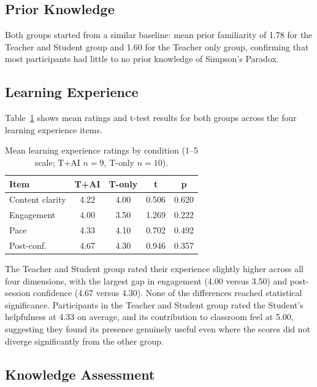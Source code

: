 \subsection{Prior Knowledge}

Both groups started from a similar baseline: mean prior familiarity of 1.78 for the Teacher and Student group and 1.60 for the Teacher only group, confirming that most participants had little to no prior knowledge of Simpson's Paradox.

\subsection{Learning Experience}

Table~\ref{tab:experience} shows mean ratings and t-test results for both groups across the four learning experience items.

\begin{table}[H]
\centering
\footnotesize
\setlength{\tabcolsep}{4pt}
\begin{tabular}{lcccc}
\toprule
\textbf{Item} & \textbf{T+AI} & \textbf{T-only} & \textbf{t} & \textbf{p} \\
\midrule
Content clarity    & 4.22 & 4.00 & 0.506 & 0.620 \\
Engagement         & 4.00 & 3.50 & 1.269 & 0.222 \\
Pace               & 4.33 & 4.10 & 0.702 & 0.492 \\
Post-conf.\        & 4.67 & 4.30 & 0.946 & 0.357 \\
\bottomrule
\end{tabular}
\caption{Mean learning experience ratings by condition (1--5 scale; T+AI $n=9$, T-only $n=10$).}
\label{tab:experience}
\end{table}

The Teacher and Student group rated their experience slightly higher across all four dimensions, with the largest gap in engagement (4.00 versus 3.50) and post-session confidence (4.67 versus 4.30). None of the differences reached statistical significance. Participants in the Teacher and Student group rated the Student's helpfulness at 4.33 on average, and its contribution to classroom feel at 5.00, suggesting they found its presence genuinely useful even where the scores did not diverge significantly from the other group.

\subsection{Knowledge Assessment}

